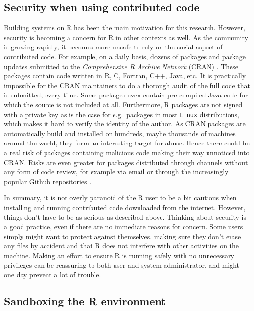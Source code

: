 \documentclass[article]{jss}
\newcommand{\R}{\textsf{R}\xspace}
\newcommand{\Java}{\textsf{Java}\xspace}
\newcommand{\C}{\textsf{C}\xspace}
\newcommand{\Cpp}{\textsf{C++}\xspace}
\newcommand{\Fortran}{\textsf{Fortran}\xspace}
\newcommand{\Linux}{\texttt{Linux}\xspace}
\begin{document}
\subsection{Security when using contributed code}


Building systems on \R has been the main motivation for this research.
However, security is becoming a concern for \R in other contexts as
well. As the community is growing rapidly, it becomes more unsafe
to rely on the social aspect of contributed code. For example, on a daily
basis, dozens of packages and package updates submitted to the
\emph{Comprehensive R Archive Network} (CRAN) \citep{ripleycran}.
These packages contain code written in \R, \C, \Fortran, \Cpp, \Java, etc. It
is practically impossible for the CRAN maintainers to do a thorough audit of the
full code that is submitted, every time. Some packages even contain pre-compiled \Java code for which the source is not included at all. Furthermore, \R packages
are not signed with a private key as is the case for e.g.\ packages in most
\Linux distributions, which makes it hard to verify the identity of the author. As
CRAN packages are automatically build and installed on hundreds, maybe thousands
of machines around the world, they form an interesting target for abuse.
Hence there could be a real risk of packages containing malicious code making
their way unnoticed into CRAN. Risks are even greater for packages 
distributed through channels without any form of code review, for example via
email or through the increasingly popular Github repositories
\citep{torvalds2010git,dabbish2012social}.

In summary, it is not overly paranoid of the \R user to be a bit
cautious when installing and running contributed code downloaded from the
internet. However, things don't have to be as serious as described above.
Thinking about security is a good practice, even if there are no immediate reasons
for concern. Some users simply might want to protect against themselves, making
sure they don't erase any files by accident and that \R does not
interfere with other activities on the machine. Making an effort to ensure
\R is running safely with no unnecessary privileges can be reassuring 
to both user and system administrator, and might one day prevent a lot of trouble.

\subsection[Sandboxing the R environment]{Sandboxing the \R environment}
\end{document}

